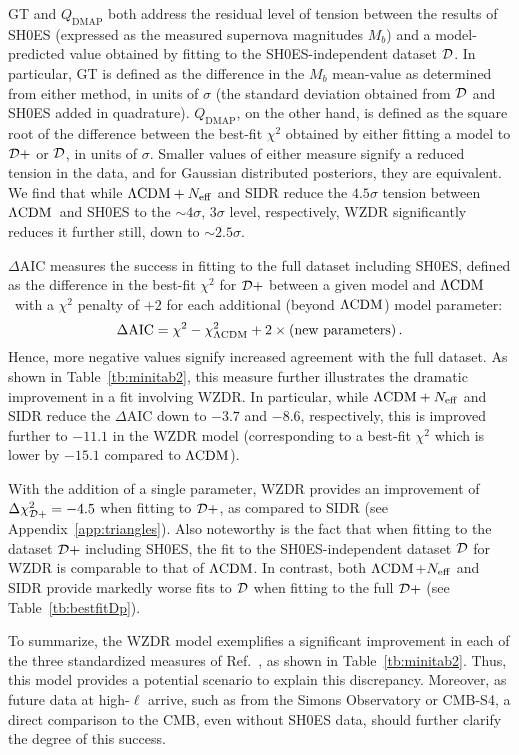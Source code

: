 \documentclass[aps,prd,twocolumn,nofootinbib,superscriptaddress]{revtex4}
\newcommand{\D}{\cal{D}}
\newcommand{\QDMAP}{Q_\text{DMAP}}
\newcommand{\App}[1]{Appendix~\ref{app:#1}}
\newcommand{\Tab}[1]{Table~\ref{tb:#1}}
\newcommand{\be}{\begin{equation}}
\newcommand{\ee}{\end{equation}}
\def\lcdm{$\Lambda{\rm CDM}$}
\newcommand{\Neff}{N_{\rm eff}}
\begin{document}
GT and $\QDMAP$ both address the residual level of tension between the results of SH0ES (expressed as the measured supernova magnitudes $M_b$) and a model-predicted value obtained by fitting to the SH0ES-independent dataset $\D$. In particular, GT is defined as the difference in the $M_b$ mean-value as determined from either method, in units of $\sigma$ (the standard deviation obtained from $\D$ and SH0ES added in quadrature). $\QDMAP$, on the other hand, is defined as the square root of the difference between the best-fit $\chi^2$ obtained by either fitting a model to $\D+$ or $\D$, in units of $\sigma$. Smaller values of either measure signify a reduced tension in the data, and for Gaussian distributed posteriors, they are equivalent. We find that while $\text{$\Lambda$CDM} + \Neff$ and SIDR reduce the $4.5 \sigma$ tension between \lcdm\ and SH0ES to the $\sim 4 \sigma$, $3 \sigma$ level, respectively, WZDR significantly reduces it further still, down to $\sim 2.5 \sigma$.

$\Delta \text{AIC}$ measures the success in fitting to the full dataset including SH0ES, defined as the difference in the best-fit $\chi^2$ for $\D+$ between a given model and \lcdm\ with a $\chi^2$ penalty of $+2$ for each additional (beyond \lcdm) model parameter:
\be
\Delta \text{AIC} =\chi^2-\chi_{\Lambda \rm CDM}^2+2 \times (\rm new\ parameters)
\, .
\ee
Hence, more negative values signify increased agreement with the full dataset. As shown in \Tab{minitab2}, this measure further illustrates the dramatic improvement in a fit involving WZDR. In particular, while $\Lambda \text{CDM} + \Neff$ and SIDR reduce the $\Delta \text{AIC}$ down to $-3.7$ and $-8.6$, respectively, this is improved further to $-11.1$ in the WZDR model (corresponding to a best-fit $\chi^2$ which is lower by $-15.1$ compared to \lcdm). 

With the addition of a single parameter, WZDR provides an improvement of $\Delta \chi_{\D+}^2 = -4.5$ when fitting to $\D+$, as compared to SIDR (see \App{triangles}). Also noteworthy is the fact that when fitting to the dataset $\D+$ including SH0ES, the fit to the SH0ES-independent dataset $\D$ for WZDR is comparable to that of \lcdm. In contrast, both \lcdm+$\Neff$ and SIDR provide markedly worse fits to $\D$ when fitting to the full $\D+$ (see \Tab{bestfitDp}).

To summarize, the WZDR model exemplifies a significant improvement in each of the three standardized measures of Ref.~\cite{Schoneberg:2021qvd}, as shown in \Tab{minitab2}. Thus, this model provides a potential scenario to explain this discrepancy. Moreover, as future data at high-$\ell$ arrive, such as from the Simons Observatory or CMB-S4, a direct comparison to the CMB, even without SH0ES data, should further clarify the degree of this success. 
\end{document}
